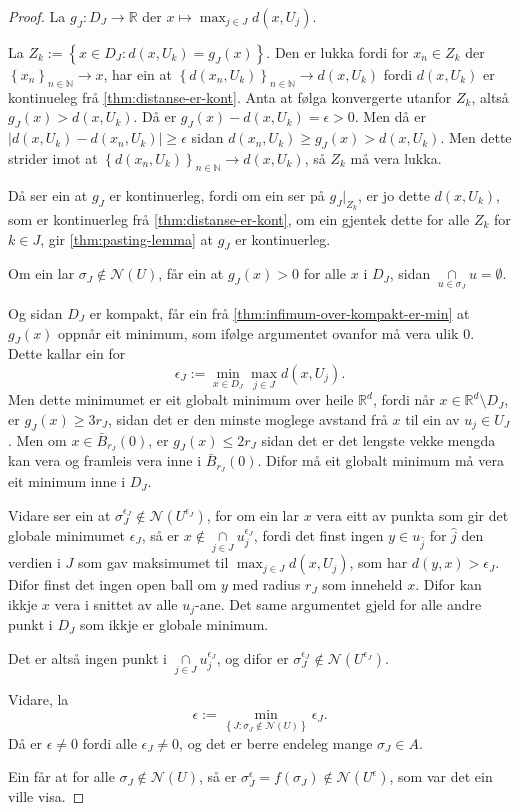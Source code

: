 \documentclass[a4paper, 12pt, norsk]{article}
\theoremstyle{plain}
\theoremstyle{definition}
\newcommand{\Rb}{\mathbb{R}}
\newcommand{\Nb}{\mathbb{N}}
\newcommand{\Nc}{\mathcal{N}}
\newcommand{\intersect}{ \mathop{\cap}\limits }
\newcommand{\set}[1]{ \left\{ #1 \right\} } %
\begin{document}
\begin{proof}
	La \( g_J: D_J \to \Rb \) der \( x \mapsto \max_{j \in J} d(x, U_j) \). 
	
	La \( Z_k := \set{x \in D_J: d(x, U_k) = g_J(x)} \). Den er lukka fordi for \( x_n \in Z_k \) der \( \set{x_n}_{n\in\Nb} \to x \), har ein at \( \set{d(x_n, U_k)}_{n\in\Nb} \to d(x, U_k) \) fordi \( d(x, U_k) \) er kontinueleg frå \autoref{thm:distanse-er-kont}. Anta at følga konvergerte utanfor \( Z_k \), altså \( g_J(x) > d(x, U_k) \). Då er \( g_J(x)-d(x, U_k) = \epsilon > 0 \). Men då er \( |d(x, U_k)-d(x_n, U_k)| \geq \epsilon \) sidan \( d(x_n, U_k) \geq g_J(x) > d(x, U_k) \). Men dette strider imot at \( \set{d(x_n, U_k)}_{n\in\Nb} \to d(x, U_k) \), så \( Z_k \) må vera lukka.
	
	Då ser ein at \( g_J \) er kontinuerleg, fordi om ein ser på \( g_J|_{Z_k} \), er jo dette \( d(x, U_k) \), som er kontinuerleg frå \autoref{thm:distanse-er-kont}, om ein gjentek dette for alle \( Z_k \) for \( k \in J \), gir \autoref{thm:pasting-lemma} at \( g_J \) er kontinuerleg.

	Om ein lar \( \sigma_J \not\in \Nc(U) \), får ein at \( g_J(x) > 0 \) for alle \( x \) i \( D_J \), sidan \( \intersect_{u \in \sigma_J} u = \emptyset \).

	Og sidan \( D_J \) er kompakt, får ein frå \autoref{thm:infimum-over-kompakt-er-min} at \( g_J(x) \) oppnår eit minimum, som ifølge argumentet ovanfor må vera ulik \( 0 \). Dette kallar ein for
	\[
		\epsilon_J := \min_{x \in D_J} \max_{j \in J} d(x, U_j).
	\]
	Men dette minimumet er eit globalt minimum over heile \( \Rb^d \), fordi når \( x \in \Rb^d \setminus D_J \), er \( g_J(x) \geq 3r_J \), sidan det er den minste moglege avstand frå \( x \) til ein av \( u_j \in U_J \). Men om \( x \in \bar{B}_{r_J}(0) \), er \( g_J(x) \leq 2r_J \) sidan det er det lengste vekke mengda kan vera og framleis vera inne i \( \bar{B}_{r_J}(0) \). Difor må eit globalt minimum må vera eit minimum inne i \( D_J \).

	Vidare ser ein at \( \sigma_J^{\epsilon_J} \not\in \Nc(U^{\epsilon_J}) \), for om ein lar \( x \) vera eitt av punkta som gir det globale minimumet \( \epsilon_J \), så er \( x \not\in \intersect_{j \in J} u_j^{\epsilon_J} \), fordi det finst ingen \( y \in  u_{\hat{j}} \) for \( \hat{j} \) den verdien i \( J \) som gav maksimumet til \( \max_{j \in J} d(x, U_j) \), som har \( d(y, x) > \epsilon_J \). Difor finst det ingen open ball om \( y \) med radius \( r_J \) som inneheld \( x \). Difor kan ikkje \( x \) vera i snittet av alle \( u_j \)-ane. Det same argumentet gjeld for alle andre punkt i \( D_J \) som ikkje er globale minimum.
	
	Det er altså ingen punkt i \( \intersect_{j \in J} u_j^{\epsilon_J} \), og difor er \( \sigma_J^{\epsilon_J} \not\in \Nc(U^{\epsilon_J}) \).

	Vidare, la
	\[
		\epsilon := \min_{\set{J : \sigma_J \not\in \Nc(U)}} \epsilon_J.
	\]
	Då er \( \epsilon \neq 0 \) fordi alle \( \epsilon_J \neq 0 \), og det er berre endeleg mange \( \sigma_J \in A \).

	Ein får at for alle \( \sigma_J \not\in \Nc(U) \), så er \( \sigma_J^{\epsilon}=f(\sigma_J) \not\in \Nc(U^{\epsilon}) \), som var det ein ville visa.
\end{proof}
\end{document}
